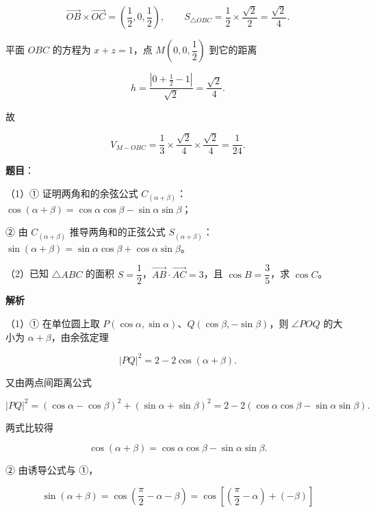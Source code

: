 \begin{answer}
\nopagebreak[4]
\[\overrightarrow{OB}\times\overrightarrow{OC}=\left(\frac12,0,\frac12\right),\qquad S_{\triangle OBC}=\frac12\times\frac{\sqrt2}2=\frac{\sqrt2}4.\]

平面 $OBC$ 的方程为 $x+z=1$，点 $M\left(0,0,\dfrac12\right)$ 到它的距离

\nopagebreak[4]
\[h=\frac{\left|0+\frac12-1\right|}{\sqrt2}=\frac{\sqrt2}4.\]

故

\nopagebreak[4]
\[V_{M-OBC}=\frac13\times\frac{\sqrt2}4\times\frac{\sqrt2}4=\frac1{24}.\]


\end{answer}
\begin{answer}

\textbf{题目}：

（1）① 证明两角和的余弦公式 $C_{(\alpha+\beta)}$：$\cos(\alpha+\beta)=\cos\alpha\cos\beta-\sin\alpha\sin\beta$；

② 由 $C_{(\alpha+\beta)}$ 推导两角和的正弦公式 $S_{(\alpha+\beta)}$：$\sin(\alpha+\beta)=\sin\alpha\cos\beta+\cos\alpha\sin\beta$。

（2）已知 $\triangle ABC$ 的面积 $S=\dfrac{1}{2}$，$\overrightarrow{AB}\cdot\overrightarrow{AC}=3$，且 $\cos B=\dfrac{3}{5}$，求 $\cos C$。

\textbf{解析}

（1）① 在单位圆上取 $P(\cos\alpha,\sin\alpha)$、$Q(\cos\beta,-\sin\beta)$，则 $\angle POQ$ 的大小为 $\alpha+\beta$，由余弦定理

\nopagebreak[4]
\[|PQ|^2=2-2\cos(\alpha+\beta).\]

又由两点间距离公式

\nopagebreak[4]
\[|PQ|^2=(\cos\alpha-\cos\beta)^2+(\sin\alpha+\sin\beta)^2=2-2\left(\cos\alpha\cos\beta-\sin\alpha\sin\beta\right).\]

两式比较得

\nopagebreak[4]
\[\cos(\alpha+\beta)=\cos\alpha\cos\beta-\sin\alpha\sin\beta.\]

② 由诱导公式与 ①，

\nopagebreak[4]
\[\sin(\alpha+\beta)=\cos\left(\frac\pi2-\alpha-\beta\right)=\cos\left[\left(\frac\pi2-\alpha\right)+(-\beta)\right]\]


\end{answer}
